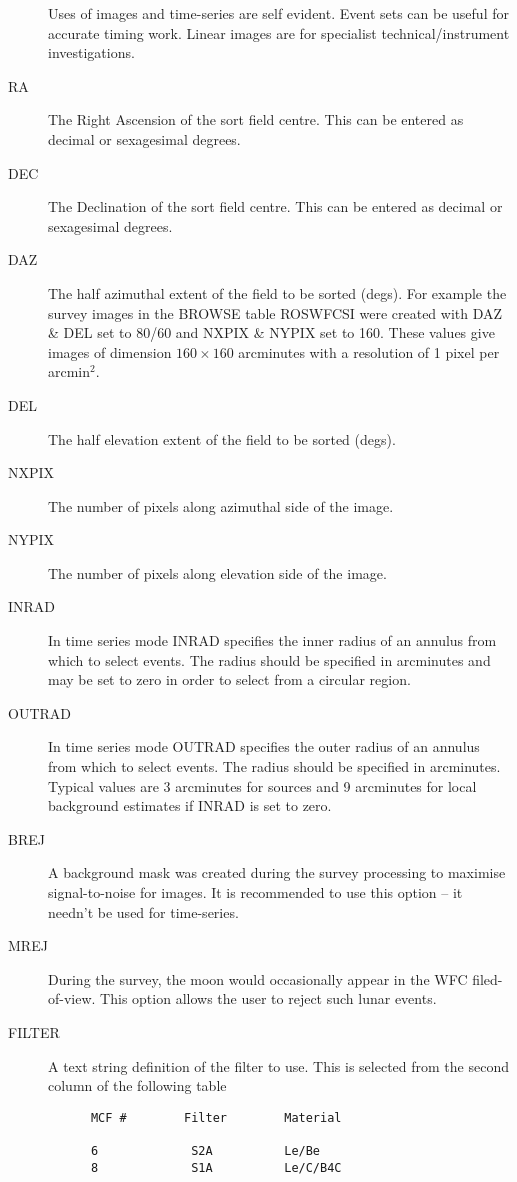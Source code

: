 \begin{description}
Uses of images and time-series are self evident.  Event sets can be
useful for accurate timing work.  Linear images are for specialist
technical/instrument investigations.
\item[RA]
The Right Ascension of the sort field centre. This can be entered as
decimal or sexagesimal degrees.
\item[DEC]
The Declination of the sort field centre. This can be entered as
decimal or sexagesimal degrees.
\item[DAZ]
The half azimuthal extent of the field to be sorted (degs).  For example the
survey images in the BROWSE table ROSWFCSI were created with DAZ \& DEL set to
80/60 and NXPIX \& NYPIX set to 160.  These values give images of dimension
$160 \times 160$ arcminutes with a resolution of 1 pixel per arcmin$^{2}$.
\item[DEL]
The half elevation extent of the field to be sorted (degs).
\item[NXPIX]
The number of pixels along azimuthal side of the image.
\item[NYPIX]
The number of pixels along elevation side of the image.
\item[INRAD]
In time series mode INRAD specifies the inner radius of an annulus
from which to select events. The radius should be specified in arcminutes
and may be set to zero in order to select from a circular region.
\item[OUTRAD]
In time series mode OUTRAD specifies the outer radius of an annulus
from which to select events. The radius should be specified in
arcminutes.  Typical values are 3 arcminutes for sources and 9 arcminutes
for local background estimates if INRAD is set to zero.
\item[BREJ ]
A background mask was created during the survey processing to
maximise signal-to-noise for images.  It is recommended to use this
option -- it needn't be used for time-series.
\item[MREJ ]
During the survey, the moon would occasionally appear in the WFC
filed-of-view.  This option allows the user to reject such lunar events.
\item[FILTER]
A text string definition of the filter to use. This is selected from
the second column of the following table

\begin{verbatim}
      MCF #        Filter        Material

      6             S2A          Le/Be
      8             S1A          Le/C/B4C


\end{verbatim}
\end{description}
